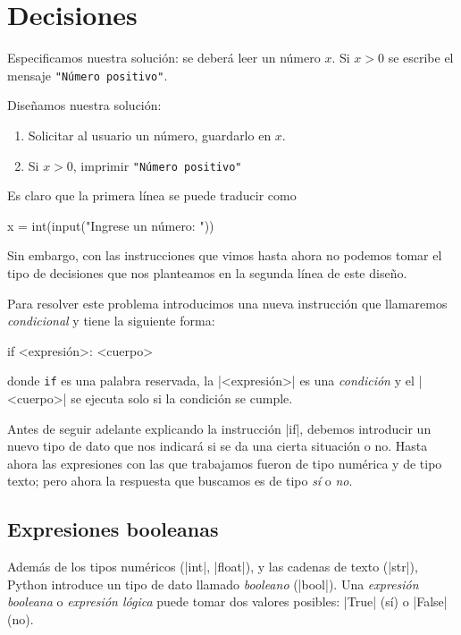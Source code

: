\chapter{Decisiones}


\begin{solucion}
Especificamos nuestra solución: se deberá leer un número $x$.
Si $x > 0$ se escribe el mensaje \lstinline!"Número positivo"!.

Diseñamos nuestra solución:

\begin{enumerate}
\item Solicitar al usuario un número, guardarlo en $x$.
\item Si $x > 0$, imprimir \lstinline!"Número positivo"!
\end{enumerate}

Es claro que la primera línea se puede traducir como
\begin{codigo-python-sn}
    x = int(input("Ingrese un número: "))
\end{codigo-python-sn}

Sin embargo, con las instrucciones que vimos hasta ahora no podemos tomar
el tipo de decisiones que nos planteamos en la segunda línea de este
diseño.
\end{solucion}

Para resolver este problema introducimos una nueva instrucción que
llamaremos \emph{condicional} y tiene la siguiente forma:
\begin{codigo-python-sn}
if <expresión>:
    <cuerpo>
\end{codigo-python-sn}
donde \lstinline+if+ es una palabra reservada, la |<expresión>| es una
\emph{condición} y el |<cuerpo>| se ejecuta solo si la condición se cumple.

Antes de seguir adelante explicando la instrucción |if|, debemos introducir
un nuevo tipo de dato que nos indicará si se da una cierta situación o no.
Hasta ahora las expresiones con las que trabajamos fueron de tipo numérica y de
tipo texto; pero ahora la respuesta que buscamos es de tipo \emph{sí} o \emph{no}.

\section{Expresiones booleanas}

Además de los tipos numéricos (|int|, |float|), y las cadenas de texto (|str|),
Python introduce un tipo de dato llamado \emph{booleano} (|bool|). Una
\emph{expresión booleana} o \emph{expresión lógica} puede tomar dos valores posibles:
|True| (sí) o |False| (no).

